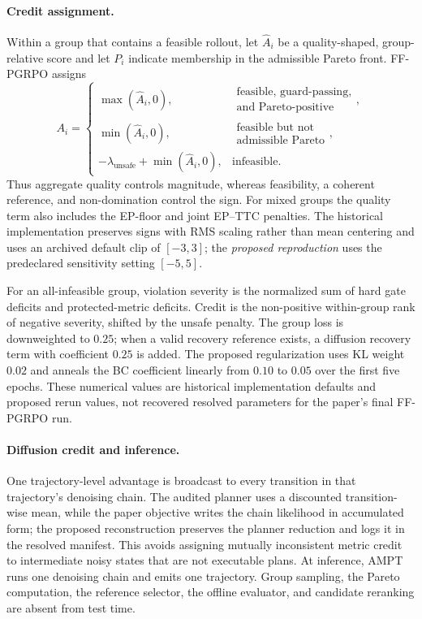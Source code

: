 \paragraph{Credit assignment.}
Within a group that contains a feasible rollout, let $\widehat A_i$ be a
quality-shaped, group-relative score and let $P_i$ indicate membership in the
admissible Pareto front.  FF-PGRPO assigns
\begin{equation}
 A_i=\begin{cases}
 \max(\widehat A_i,0),
   & \substack{\text{feasible, guard-passing,}\\\text{and Pareto-positive}},\\
 \min(\widehat A_i,0),
   & \substack{\text{feasible but not}\\\text{admissible Pareto}},\\
 -\lambda_{\mathrm{unsafe}}+\min(\widehat A_i,0),
   & \text{infeasible}.
 \end{cases}
\end{equation}
Thus aggregate quality controls magnitude, whereas feasibility, a coherent
reference, and non-domination control the sign.  For mixed groups the quality
term also includes the EP-floor and joint EP--TTC penalties.  The historical
implementation preserves signs with RMS scaling rather than mean centering and
uses an archived default clip of $[-3,3]$; the \emph{proposed reproduction}
uses the predeclared sensitivity setting $[-5,5]$.

For an all-infeasible group, violation severity is the normalized sum of hard
gate deficits and protected-metric deficits.  Credit is the non-positive
within-group rank of negative severity, shifted by the unsafe penalty.  The
group loss is downweighted to $0.25$; when a valid recovery reference exists,
a diffusion recovery term with coefficient $0.25$ is added.  The proposed
regularization uses KL weight $0.02$ and anneals the BC coefficient linearly
from $0.10$ to $0.05$ over the first five epochs.  These numerical values are
historical implementation defaults and proposed rerun values, not recovered
resolved parameters for the paper's final FF-PGRPO run.

\paragraph{Diffusion credit and inference.}
One trajectory-level advantage is broadcast to every transition in that
trajectory's denoising chain.  The audited planner uses a discounted
transition-wise mean, while the paper objective writes the chain likelihood in
accumulated form; the proposed reconstruction preserves the planner reduction
and logs it in the resolved manifest.  This avoids assigning mutually
inconsistent metric credit to intermediate noisy states that are not executable
plans.  At inference, AMPT runs one denoising chain and emits one trajectory.
Group sampling, the Pareto computation, the reference selector, the offline
evaluator, and candidate reranking are absent from test time.

